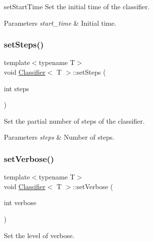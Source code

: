 set\+Start\+Time Set the initial time of the classifier. 


\begin{DoxyParams}{Parameters}
{\em start\+\_\+time} & Initial time. \\
\hline
\end{DoxyParams}
\mbox{\label{class_classifier_a55c37a2a00b3dce578d6fde547376dae}} 
\subsubsection{\texorpdfstring{set\+Steps()}{setSteps()}}
{\footnotesize\ttfamily template$<$typename T$>$ \\
void \hyperlink{class_classifier}{Classifier}$<$ T $>$\+::set\+Steps (\begin{DoxyParamCaption}\item[{int}]{steps }\end{DoxyParamCaption})\hspace{0.3cm}{\ttfamily [inline]}}



Set the partial number of steps of the classifier. 


\begin{DoxyParams}{Parameters}
{\em steps} & Number of steps. \\
\hline
\end{DoxyParams}
\mbox{\label{class_classifier_ac9e142714dff18a8caa5c9e3d7cfcbfc}} 
\subsubsection{\texorpdfstring{set\+Verbose()}{setVerbose()}}
{\footnotesize\ttfamily template$<$typename T$>$ \\
void \hyperlink{class_classifier}{Classifier}$<$ T $>$\+::set\+Verbose (\begin{DoxyParamCaption}\item[{int}]{verbose }\end{DoxyParamCaption})\hspace{0.3cm}{\ttfamily [inline]}}



Set the level of verbose. 



